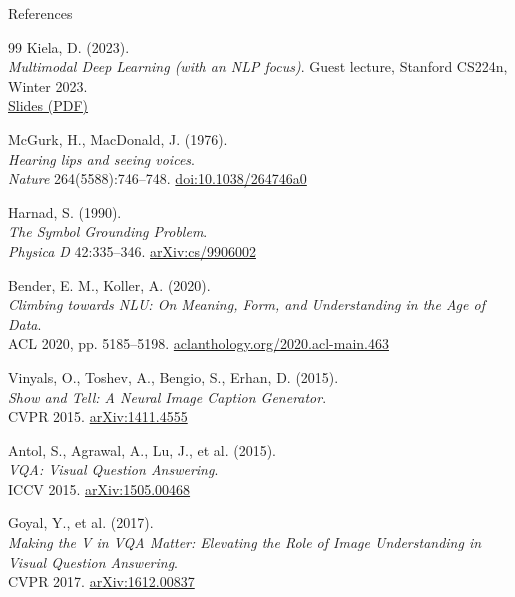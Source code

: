 \begin{frame}[allowframebreaks]{References}
  \footnotesize
  \begin{thebibliography}{99}
      Kiela, D. (2023). \\
      \emph{Multimodal Deep Learning (with an NLP focus)}. Guest lecture, Stanford CS224n, Winter 2023.\\
      \href{https://web.stanford.edu/class/archive/cs/cs224n/cs224n.1234/slides/Multimodal-Deep-Learning-CS224n-Kiela.pdf}{Slides (PDF)}

      McGurk, H., MacDonald, J. (1976). \\
      \emph{Hearing lips and seeing voices}.\\
      \emph{Nature} 264(5588):746--748. \href{https://doi.org/10.1038/264746a0}{doi:10.1038/264746a0}

      Harnad, S. (1990). \\
      \emph{The Symbol Grounding Problem}.\\
      \emph{Physica D} 42:335--346. \href{https://arxiv.org/abs/cs/9906002}{arXiv:cs/9906002}

      Bender, E. M., Koller, A. (2020). \\
      \emph{Climbing towards NLU: On Meaning, Form, and Understanding in the Age of Data}.\\
      ACL 2020, pp. 5185--5198. \href{https://aclanthology.org/2020.acl-main.463/}{aclanthology.org/2020.acl-main.463}

      Vinyals, O., Toshev, A., Bengio, S., Erhan, D. (2015). \\
      \emph{Show and Tell: A Neural Image Caption Generator}.\\
      CVPR 2015. \href{https://arxiv.org/abs/1411.4555}{arXiv:1411.4555}

      Antol, S., Agrawal, A., Lu, J., et al. (2015). \\
      \emph{VQA: Visual Question Answering}.\\
      ICCV 2015. \href{https://arxiv.org/abs/1505.00468}{arXiv:1505.00468}

      Goyal, Y., et al. (2017). \\
      \emph{Making the V in VQA Matter: Elevating the Role of Image Understanding in Visual Question Answering}.\\
      CVPR 2017. \href{https://arxiv.org/abs/1612.00837}{arXiv:1612.00837}


\end{thebibliography}
\end{frame}
